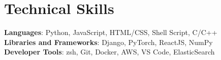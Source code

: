 \documentclass[letterpaper,11pt]{article}
\begin{document}
%
\section{Technical Skills}
 \begin{itemize}[leftmargin=0.15in, label={}]
    \small{\item{
     \textbf{Languages}{: Python,  JavaScript, HTML/CSS, Shell Script, C/C++} \\
     \textbf{Libraries and Frameworks}{: Django, PyTorch, ReactJS, NumPy} \\
     \textbf{Developer Tools}{: zsh, Git, Docker, AWS, VS Code, ElasticSearch}
    }}
 \end{itemize}



\end{document}
